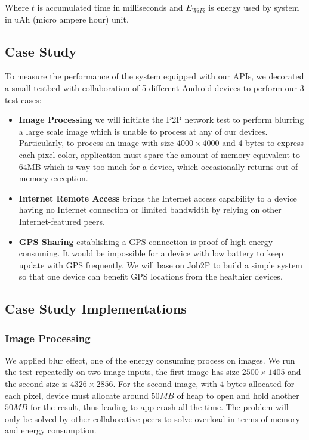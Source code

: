 \documentclass[conference]{IEEEtran}
\begin{document}
Where $t$ is accumulated time in milliseconds and $E_{WiFi}$ is energy used by system in uAh (micro ampere hour) unit.

\subsection{Case Study}
To measure the performance of the system equipped with our APIs, we decorated a small testbed with collaboration of 5 different Android devices to perform our 3 test cases:
\begin{itemize}
	\item \textbf{Image Processing} we will initiate the P2P network test to perform blurring a large scale image which is unable to process at any of our devices. Particularly, to process an image with size $4000 \times 4000$ and 4 bytes to express each pixel color, application must spare the amount of memory equivalent to 64MB which is way too much for a device, which occasionally returns out of memory exception.
	\item \textbf{Internet Remote Access} brings the Internet access capability to a device having no Internet connection or limited bandwidth by relying on other Internet-featured peers.
	\item \textbf{GPS Sharing} establishing a GPS connection is proof of high energy consuming. It would be impossible for a device with low battery to keep update with GPS frequently. We will base on Job2P to build a simple system so that one device can benefit GPS locations from the healthier devices.
\end{itemize}

\subsection{Case Study Implementations}

\subsubsection{Image Processing}
We applied blur effect, one of the energy consuming process on images. We run the test repeatedly on two image inputs, the first image has size $2500 \times 1405$ and the second size is $4326 \times 2856$. For the second image, with 4 bytes allocated for each pixel, device must allocate around $50MB$ of heap to open and hold another $50MB$ for the result, thus leading to app crash all the time. The problem will only be solved by other collaborative peers to solve overload in terms of memory and energy consumption.
\end{document}
